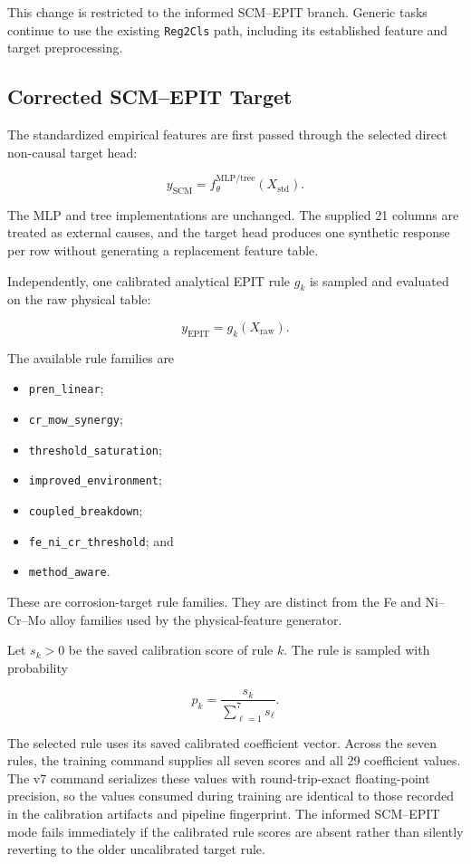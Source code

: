 \documentclass{article}
\begin{document}
This change is restricted to the informed SCM--EPIT branch. Generic tasks
continue to use the existing \texttt{Reg2Cls} path, including its established
feature and target preprocessing.

\subsection{Corrected SCM--EPIT Target}

The standardized empirical features are first passed through the selected
direct non-causal target head:

\[
y_{\mathrm{SCM}}
=
f_{\theta}^{\mathrm{MLP/tree}}
\left(X_{\mathrm{std}}\right).
\]

The MLP and tree implementations are unchanged. The supplied 21 columns are
treated as external causes, and the target head produces one synthetic
response per row without generating a replacement feature table.

Independently, one calibrated analytical EPIT rule \(g_k\) is sampled and
evaluated on the raw physical table:

\[
y_{\mathrm{EPIT}}
=
g_k\left(X_{\mathrm{raw}}\right).
\]

The available rule families are

\begin{itemize}
    \item \texttt{pren\_linear};
    \item \texttt{cr\_mow\_synergy};
    \item \texttt{threshold\_saturation};
    \item \texttt{improved\_environment};
    \item \texttt{coupled\_breakdown};
    \item \texttt{fe\_ni\_cr\_threshold}; and
    \item \texttt{method\_aware}.
\end{itemize}

These are corrosion-target rule families. They are distinct from the Fe and
Ni--Cr--Mo alloy families used by the physical-feature generator.

Let \(s_k>0\) be the saved calibration score of rule \(k\). The rule is sampled
with probability

\[
p_k
=
\frac{s_k}{\sum_{\ell=1}^{7}s_\ell}.
\]

The selected rule uses its saved calibrated coefficient vector. Across the
seven rules, the training command supplies all seven scores and all 29
coefficient values. The v7 command serializes these values with
round-trip-exact floating-point precision, so the values consumed during
training are identical to those recorded in the calibration artifacts and
pipeline fingerprint. The informed SCM--EPIT mode fails immediately if the
calibrated rule scores are absent rather than silently reverting to the older
uncalibrated target rule.
\end{document}
